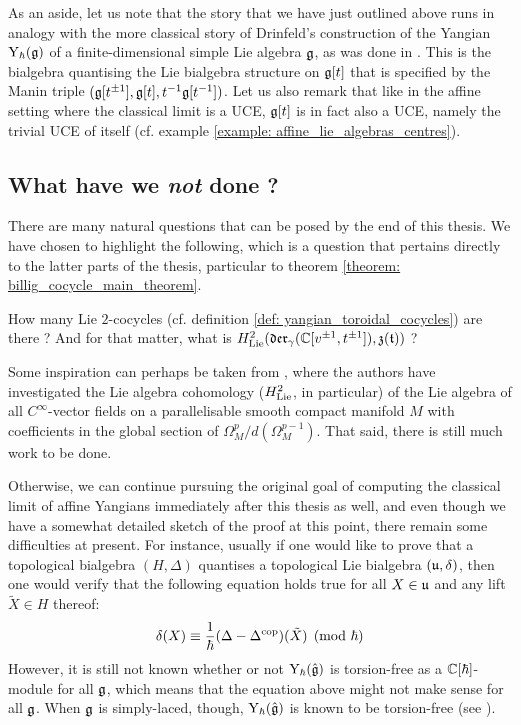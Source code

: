         As an aside, let us note that the story that we have just outlined above runs in analogy with the more classical story of Drinfeld's construction of the Yangian $\mathrm{Y}_{\hbar}(\mathfrak{g})$ of a finite-dimensional simple Lie algebra $\mathfrak{g}$, as was done in \cite{drinfeld_original_yangian_paper}. This is the bialgebra quantising the Lie bialgebra structure on $\mathfrak{g}[t]$ that is specified by the Manin triple $(\mathfrak{g}[t^{\pm 1}], \mathfrak{g}[t], t^{-1}\mathfrak{g}[t^{-1}])$. Let us also remark that like in the affine setting where the classical limit is a UCE, $\mathfrak{g}[t]$ is in fact also a UCE, namely the trivial UCE of itself (cf. example \ref{example: affine_lie_algebras_centres}).

    \subsection{What have we \textit{not} done ?}
        There are many natural questions that can be posed by the end of this thesis. We have chosen to highlight the following, which is a question that pertains directly to the latter parts of the thesis, particular to theorem \ref{theorem: billig_cocycle_main_theorem}.
        \begin{question}
            How many  Lie $2$-cocycles (cf. definition \ref{def: yangian_toroidal_cocycles}) are there ? And for that matter, what is $H^2_{\mathrm{Lie}}(\mathfrak{der}_{\gamma}(\mathbb{C}[v^{\pm 1}, t^{\pm 1}]), \mathfrak{z}(\mathfrak{t}))$ ?
        \end{question}
        Some inspiration can perhaps be taken from \cite{billig_neeb_vector_field_cyclic_cohomology_parallelisable_manifolds}, where the authors have investigated the Lie algebra cohomology ($H^2_{\mathrm{Lie}}$, in particular) of the Lie algebra of all $C^{\infty}$-vector fields on a parallelisable smooth compact manifold $M$ with coefficients in the global section of $\Omega^p_M/d( \Omega^{p - 1}_M )$. That said, there is still much work to be done.

        Otherwise, we can continue pursuing the original goal of computing the classical limit of affine Yangians immediately after this thesis as well, and even though we have a somewhat detailed sketch of the proof at this point, there remain some difficulties at present. For instance, usually if one would like to prove that a topological bialgebra $(H, \Delta)$ quantises a topological Lie bialgebra $(\mathfrak{u}, \delta)$, then one would verify that the following equation holds true for all $X \in \mathfrak{u}$ and any lift $\tilde{X} \in H$ thereof:
            $$\delta(X) \equiv \frac{1}{\hbar}(\Delta - \Delta^{\mathrm{cop}})(\tilde{X}) \pmod{\hbar}$$
        However, it is still not known whether or not $\mathrm{Y}_{\hbar}(\hat{\mathfrak{g}})$ is torsion-free as a $\mathbb{C}[\hbar]$-module for all $\mathfrak{g}$, which means that the equation above might not make sense for all $\mathfrak{g}$. When $\mathfrak{g}$ is simply-laced, though, $\mathrm{Y}_{\hbar}(\hat{\mathfrak{g}})$ is known to be torsion-free (see \cite[Section 6]{guay_regelskis_wendlandt_affine_yangian_vertex_representations_and_PBW}).